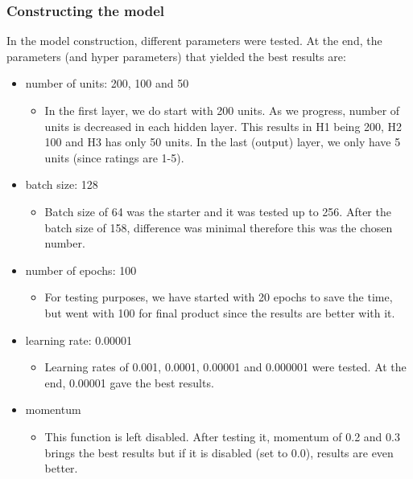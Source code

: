 \subsubsection{Constructing the model}
In the model construction, different parameters were tested. At the end, the parameters (and hyper parameters) that yielded the best results are:
\begin{itemize}
    \item number of units: 200, 100 and 50
    \begin{itemize}
        \item In the first layer, we do start with 200 units. As we progress, number of units is decreased in each hidden layer. This results in H1 being 200, H2 100 and H3 has only 50 units. In the last (output) layer, we only have 5 units (since ratings are 1-5).
    \end{itemize}
    
    \item batch size: 128
    \begin{itemize}
        \item Batch size of 64 was the starter and it was tested up to 256. After the batch size of 158, difference was minimal therefore this was the chosen number.
    \end{itemize}
    
    \item number of epochs: 100
    \begin{itemize}
        \item For testing purposes, we have started with 20 epochs to save the time, but went with 100 for final product since the results are better with it.
    \end{itemize}
    
    \item learning rate: 0.00001
    \begin{itemize}
        \item Learning rates of 0.001, 0.0001, 0.00001 and 0.000001 were tested. At the end, 0.00001 gave the best results.
    \end{itemize}
    
    \item momentum
    \begin{itemize}
        \item This function is left disabled. After testing it, momentum of 0.2 and 0.3 brings the best results but if it is disabled (set to 0.0), results are even better.
    \end{itemize}
    

\end{itemize}
